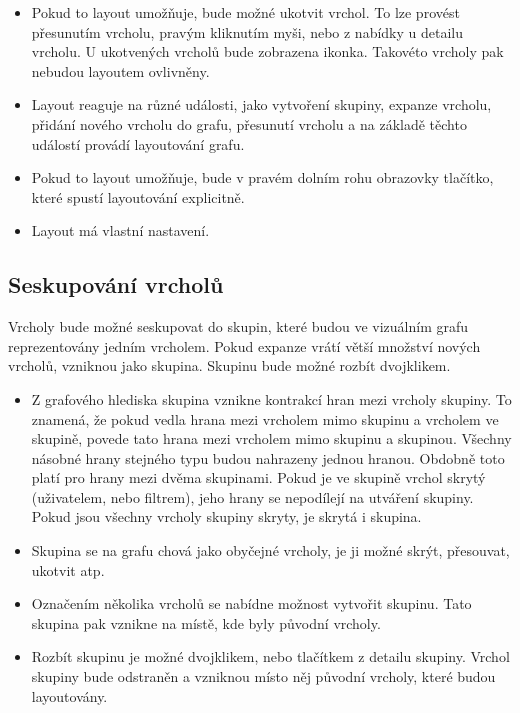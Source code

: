 \begin{itemize}
    \item Pokud to layout umožňuje, bude možné ukotvit vrchol. To lze provést přesunutím vrcholu, pravým kliknutím myši, nebo z nabídky u detailu vrcholu. U ukotvených vrcholů bude zobrazena ikonka. Takovéto vrcholy pak nebudou layoutem ovlivněny.
    \item Layout reaguje na různé události, jako vytvoření skupiny, expanze vrcholu, přidání nového vrcholu do grafu, přesunutí vrcholu a na základě těchto událostí provádí layoutování grafu.
    \item Pokud to layout umožňuje, bude v pravém dolním rohu obrazovky tlačítko, které spustí layoutování explicitně.
    \item Layout má vlastní nastavení.
\end{itemize}

\subsection*{Seskupování vrcholů}
Vrcholy bude možné seskupovat do skupin, které budou ve vizuálním grafu reprezentovány jedním vrcholem. Pokud expanze vrátí větší množství nových vrcholů, vzniknou jako skupina. Skupinu bude možné rozbít dvojklikem.

\begin{itemize}
    \item Z grafového hlediska skupina vznikne kontrakcí hran mezi vrcholy skupiny. To znamená, že pokud vedla hrana mezi vrcholem mimo skupinu a vrcholem ve skupině, povede tato hrana mezi vrcholem mimo skupinu a skupinou. Všechny násobné hrany stejného typu budou nahrazeny jednou hranou. Obdobně toto platí pro hrany mezi dvěma skupinami. Pokud je ve skupině vrchol skrytý (uživatelem, nebo filtrem), jeho hrany se nepodílejí na utváření skupiny. Pokud jsou všechny vrcholy skupiny skryty, je skrytá i skupina.
    \item Skupina se na grafu chová jako obyčejné vrcholy, je ji možné skrýt, přesouvat, ukotvit atp.
    \item Označením několika vrcholů se nabídne možnost vytvořit skupinu. Tato skupina pak vznikne na místě, kde byly původní vrcholy.
    \item Rozbít skupinu je možné dvojklikem, nebo tlačítkem z detailu skupiny. Vrchol skupiny bude odstraněn a vzniknou místo něj původní vrcholy, které budou layoutovány.
\end{itemize}
